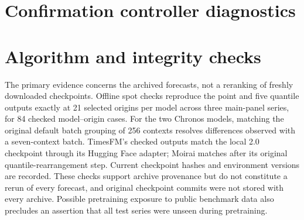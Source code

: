 \clearpage
\section{Confirmation controller diagnostics}\label{app:confirmation}
\begin{table}[htbp]\centering\scriptsize
\caption{Confirmation contrasts at $h=24$. Each row contains four series and two models.
Gain and median are paired interval-score improvements (\%); A is the first method in
the comparison and B the second. Coverage is in percent, target 90\%. Correlated pairs
are retained without interpreting the win count as independent replications.}
\label{tab:confirmation}
\end{table}

\begin{table}[h!]\centering\scriptsize
\caption{Unified comparison on the revisited panel at $h=24$. IS ratio averages
per-pair interval scores divided by that pair's residual rolling-quantile score;
lower is better. Family coverage is percent (target 90\%). Local is the family-balanced
150-origin absolute coverage error in percentage points; Singleton is percent.
Original rows retain locked-grid results, wide ACI and multi-step PID are subsequent
sensitivities. PI-log and SF-OGD retain fixed defaults, not tuned optima.}

\end{table}


\clearpage
\section{Algorithm and integrity checks}\label{app:integrity}
The primary evidence concerns the archived forecasts, not a reranking of freshly
downloaded checkpoints. Offline spot checks reproduce the point and five quantile outputs
exactly at 21 selected origins per model across three main-panel series, for 84 checked
model--origin cases. For the two Chronos models, matching the original default batch
grouping of 256 contexts resolves differences observed with a seven-context batch.
TimesFM's checked outputs match the local 2.0 checkpoint through its Hugging Face adapter;
Moirai matches after its original quantile-rearrangement step. Current checkpoint hashes
and environment versions are recorded. These checks support archive provenance but
do not constitute a rerun of every forecast, and original checkpoint commits were not
stored with every archive. Possible pretraining exposure to
public benchmark data also precludes an assertion that all test series were unseen during
pretraining.


